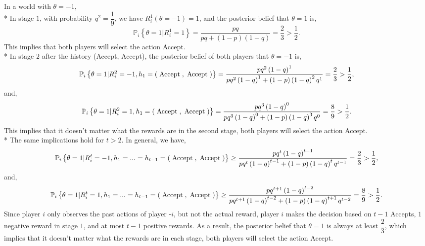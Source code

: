 \documentclass{article}
\begin{document}
In a world with $\theta = -1$,
\\* In stage $1$, with probability $q^{2} = \dfrac{1}{9}$, we have $R_{i}^{1}\left(\theta = -1\right) = 1$, and the posterior belief that $\theta = 1$ is,
\begin{equation} 
\mathbb{P}_{i} \left\{\theta = 1 | R_{i}^{1} = 1\right\} = \dfrac{p q}{p q + \left(1 - p\right)\left(1 - q\right)} = \dfrac{2}{3} > \dfrac{1}{2} .
\end{equation}
This implies that both players will select the action Accept.
\\* In stage $2$ after the history {(Accept, Accept)}, the posterior belief of both players that $\theta = -1$ is,
\begin{equation} 
\mathbb{P}_{i} \left\{\theta = 1 | R_{i}^{2} = -1, h_{1} = \left(\text{\;Accept\;}, \text{\;Accept\;}\right)\right\} = \dfrac{p q^{2} \left(1 - q\right)^{1}}{p q^{2} \left(1 - q\right)^{1} + \left(1 - p\right)\left(1 - q\right)^{2} q^{1}} = \dfrac{2}{3} > \dfrac{1}{2} ,
\end{equation}
and,
\begin{equation} 
\mathbb{P}_{i} \left\{\theta = 1 | R_{i}^{2} = 1, h_{1} = \left(\text{\;Accept\;}, \text{\;Accept\;}\right)\right\} = \dfrac{p q^{3} \left(1 - q\right)^{0}}{p q^{3} \left(1 - q\right)^{0} + \left(1 - p\right)\left(1 - q\right)^{3} q^{0}} = \dfrac{8}{9} > \dfrac{1}{2} .
\end{equation}
This implies that it doesn't matter what the rewards are in the second stage, both players will select the action Accept.
\\* The same implications hold for $t  > 2$. In general, we have,
\begin{equation} 
\mathbb{P}_{i} \left\{\theta = 1 | R_{i}^{t} = -1, h_{1} = ... = h_{t-1} = \left(\text{\;Accept\;}, \text{\;Accept\;}\right)\right\} \geq  \dfrac{p q^{t} \left(1 - q\right)^{t-1}}{p q^{t} \left(1 - q\right)^{t-1} + \left(1 - p\right)\left(1 - q\right)^{t} q^{t-1}} = \dfrac{2}{3} > \dfrac{1}{2} ,
\end{equation}
and,
\begin{equation} 
\mathbb{P}_{i} \left\{\theta = 1 | R_{i}^{t} = 1, h_{1} = ... = h_{t-1} = \left(\text{\;Accept\;}, \text{\;Accept\;}\right)\right\} \geq  \dfrac{p q^{t+1} \left(1 - q\right)^{t-2}}{p q^{t+1} \left(1 - q\right)^{t-2} + \left(1 - p\right)\left(1 - q\right)^{t+1} q^{t-2}} = \dfrac{8}{9} > \dfrac{1}{2} .
\end{equation}
Since player $i $ only observes the past actions of player -$i $, but not the actual reward, player $i $ makes the decision based on $t  - 1$ Accepts, $1$ negative reward in stage $1$, and at most $t  - 1$ positive rewards. As a result, the posterior belief that $\theta = 1$ is always at least $\dfrac{2}{3}$, which implies that it doesn't matter what the rewards are in each stage, both players will select the action Accept.
\end{document}
